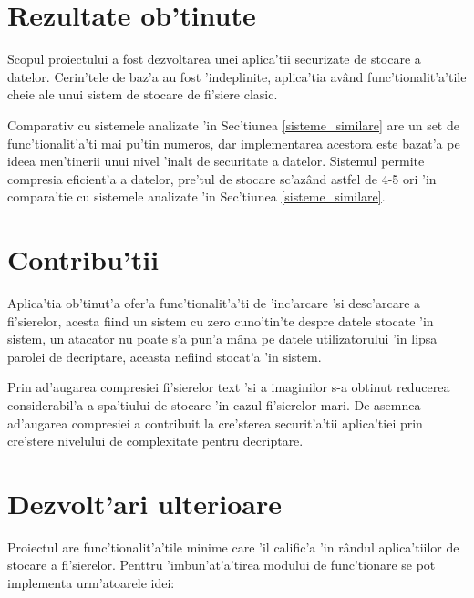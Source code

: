 \documentclass[12pt,a4paper,twoside]{report}
\begin{document}
\section{Rezultate ob'tinute}
Scopul proiectului a fost dezvoltarea unei aplica'tii securizate de stocare a datelor. Cerin'tele de baz'a au fost 'indeplinite, aplica'tia având func'tionalit'a'tile cheie ale unui sistem de stocare de fi'siere clasic.

Comparativ cu sistemele analizate 'in Sec'tiunea \ref{sisteme_similare} are un set de func'tionalit'a'ti mai pu'tin numeros, dar implementarea acestora este bazat'a pe ideea men'tinerii unui nivel 'inalt de securitate a datelor. 
Sistemul permite compresia eficient'a a datelor, pre'tul de stocare sc'azând astfel de 4-5 ori 'in compara'tie cu sistemele analizate 'in Sec'tiunea  \ref{sisteme_similare}. 



\section{Contribu'tii}
Aplica'tia ob'tinut'a ofer'a func'tionalit'a'ti de 'inc'arcare 'si desc'arcare  a fi'sierelor, acesta fiind un sistem cu zero cuno'tin'te despre datele stocate 'in sistem, un atacator nu poate s'a pun'a mâna pe datele utilizatorului 'in lipsa parolei de decriptare, aceasta nefiind stocat'a 'in sistem.

Prin ad'augarea compresiei fi'sierelor text 'si a imaginilor  s-a  obtinut reducerea considerabil'a a spa'tiului de stocare 'in cazul fi'sierelor mari. De asemnea ad'augarea compresiei a contribuit la cre'sterea securit'a'tii aplica'tiei prin cre'stere nivelului de complexitate pentru decriptare. 

\section{Dezvolt'ari ulterioare}
Proiectul are func'tionalit'a'tile minime care 'il calific'a 'in rândul aplica'tiilor de stocare a fi'sierelor. Penttru 'imbun'at'a'tirea modului de func'tionare se pot implementa urm'atoarele idei:
\end{document}
